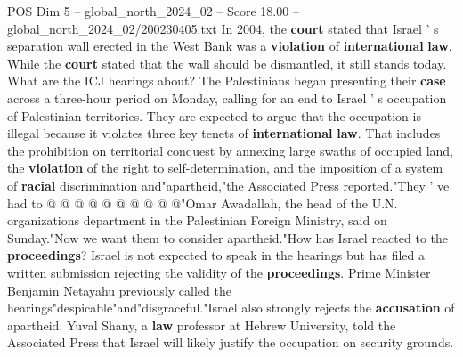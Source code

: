 \begin{textsample}{POS Dim 5 – global\_north\_2024\_02 – Score 18.00 – global\_north\_2024\_02/200230405.txt}
In 2004, the \textbf{court} stated that Israel ' s separation wall erected in the West Bank was a \textbf{violation} of \textbf{international} \textbf{law}.
While the \textbf{court} stated that the wall should be dismantled, it still stands today.
What are the ICJ hearings about?
The Palestinians began presenting their \textbf{case} across a three-hour period on Monday, calling for an end to Israel ' s occupation of Palestinian territories.
They are expected to argue that the occupation is illegal because it violates three key tenets of \textbf{international} \textbf{law}.
That includes the prohibition on territorial conquest by annexing large swaths of occupied land, the \textbf{violation} of the right to self-determination, and the imposition of a system of \textbf{racial} discrimination and"apartheid,"the Associated Press reported."They ' ve had to @ @ @ @ @ @ @ @ @ @"Omar Awadallah, the head of the U.N. organizations department in the Palestinian Foreign Ministry, said on Sunday."Now we want them to consider apartheid."How has Israel reacted to the \textbf{proceedings}?
Israel is not expected to speak in the hearings but has filed a written submission rejecting the validity of the \textbf{proceedings}.
Prime Minister Benjamin Netayahu previously called the hearings"despicable"and"disgraceful."Israel also strongly rejects the \textbf{accusation} of apartheid.
Yuval Shany, a \textbf{law} professor at Hebrew University, told the Associated Press that Israel will likely justify the occupation on security grounds.

\end{textsample}
